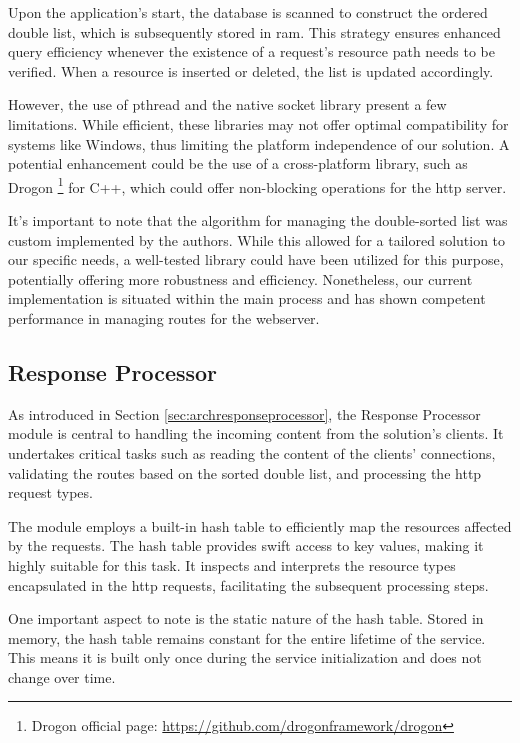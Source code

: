 \documentclass[a4paper,fleqn]{cas-dc}
\begin{document}
Upon the application's start, the database is scanned to construct the ordered double list, which is subsequently stored in \gls{ram}. This strategy ensures enhanced query efficiency whenever the existence of a request's resource path needs to be verified. When a resource is inserted or deleted, the list is updated accordingly.

However, the use of pthread and the native socket library present a few limitations. While efficient, these libraries may not offer optimal compatibility for systems like Windows, thus limiting the platform independence of our solution. A potential enhancement could be the use of a cross-platform library, such as Drogon \footnote{Drogon official page: \url{https://github.com/drogonframework/drogon}} for C++, which could offer non-blocking operations for the \gls{http} server.

It's important to note that the algorithm for managing the double-sorted list was custom implemented by the authors. While this allowed for a tailored solution to our specific needs, a well-tested library could have been utilized for this purpose, potentially offering more robustness and efficiency. Nonetheless, our current implementation is situated within the main process and has shown competent performance in managing routes for the webserver.

\subsection{Response Processor}

As introduced in Section \ref{sec:archresponseprocessor}, the Response Processor module is central to handling the incoming content from the solution's clients. It undertakes critical tasks such as reading the content of the clients' connections, validating the routes based on the sorted double list, and processing the \gls{http} request types.

The module employs a built-in hash table to efficiently map the resources affected by the requests. The hash table provides swift access to key values, making it highly suitable for this task. It inspects and interprets the resource types encapsulated in the \gls{http} requests, facilitating the subsequent processing steps.

One important aspect to note is the static nature of the hash table. Stored in memory, the hash table remains constant for the entire lifetime of the service. This means it is built only once during the service initialization and does not change over time.
\end{document}
